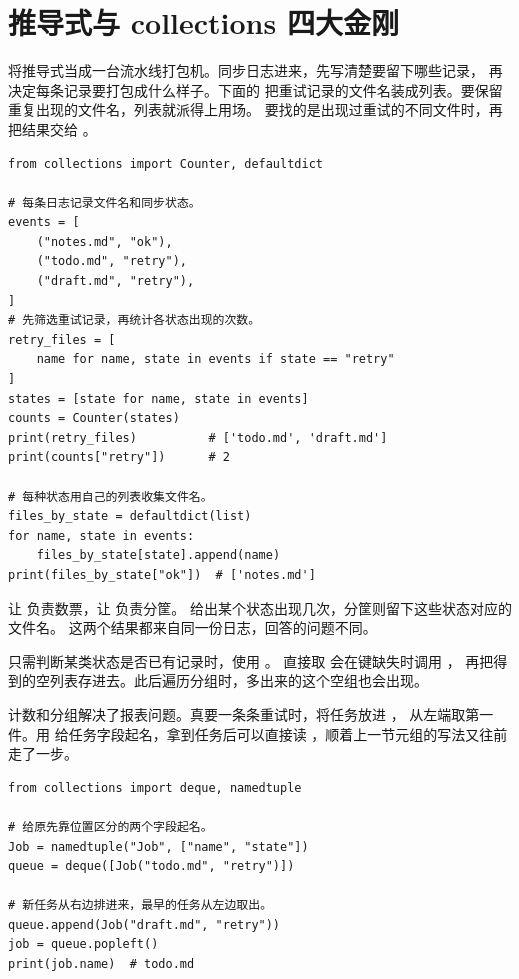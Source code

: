 \section{推导式与 collections 四大金刚}
\label{sec:comprehensions-collections}

将推导式当成一台流水线打包机。同步日志进来，先写清楚要留下哪些记录，
再决定每条记录要打包成什么样子。下面的 \code{[name for name, state in events if state == "retry"]}
把重试记录的文件名装成列表。要保留重复出现的文件名，列表就派得上用场。
要找的是出现过重试的不同文件时，再把结果交给 。


\begin{lstlisting}[title={\code{sync_report.py}}]
from collections import Counter, defaultdict

# 每条日志记录文件名和同步状态。
events = [
    ("notes.md", "ok"),
    ("todo.md", "retry"),
    ("draft.md", "retry"),
]
# 先筛选重试记录，再统计各状态出现的次数。
retry_files = [
    name for name, state in events if state == "retry"
]
states = [state for name, state in events]
counts = Counter(states)
print(retry_files)          # ['todo.md', 'draft.md']
print(counts["retry"])      # 2

# 每种状态用自己的列表收集文件名。
files_by_state = defaultdict(list)
for name, state in events:
    files_by_state[state].append(name)
print(files_by_state["ok"])  # ['notes.md']
\end{lstlisting}


\begin{myunderstanding}
让  负责数票，让  负责分筐。
 给出某个状态出现几次，分筐则留下这些状态对应的文件名。
这两个结果都来自同一份日志，回答的问题不同。
\end{myunderstanding}

\begin{pitfall}
只需判断某类状态是否已有记录时，使用 。
直接取  会在键缺失时调用 ，
再把得到的空列表存进去。此后遍历分组时，多出来的这个空组也会出现。
\end{pitfall}

计数和分组解决了报表问题。真要一条条重试时，将任务放进 ，
从左端取第一件。用  给任务字段起名，拿到任务后可以直接读
，顺着上一节元组的写法又往前走了一步。


\begin{lstlisting}[title={\code{retry_queue.py}}]
from collections import deque, namedtuple

# 给原先靠位置区分的两个字段起名。
Job = namedtuple("Job", ["name", "state"])
queue = deque([Job("todo.md", "retry")])

# 新任务从右边排进来，最早的任务从左边取出。
queue.append(Job("draft.md", "retry"))
job = queue.popleft()
print(job.name)  # todo.md
\end{lstlisting}


